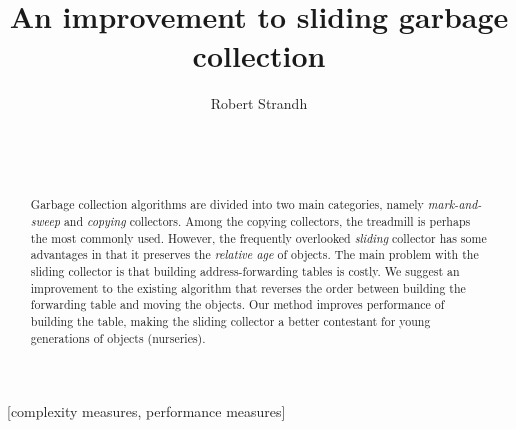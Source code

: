 \documentclass{acm_proc_article-sp}
\def\inputtex#1{}
\begin{document}
\title{An improvement to sliding garbage collection}
\author{\alignauthor
Robert Strandh\\
\\
\\
\\
}

\maketitle

\begin{abstract}
Garbage collection algorithms are divided into two main categories,
namely \emph{mark-and-sweep} and \emph{copying} collectors.  Among the
copying collectors, the treadmill is perhaps the most
commonly used.  However, the frequently overlooked \emph{sliding}
collector has some advantages in that it preserves the \emph{relative
  age} of objects.  The main problem with the sliding collector is
that building address-forwarding tables is costly.  We suggest an
improvement to the existing algorithm that reverses the order between
building the forwarding table and moving the objects.  Our method
improves performance of building the table, making the sliding
collector a better contestant for young generations of objects
(nurseries). 
\end{abstract}

[complexity measures, performance measures]

\inputtex{sec-introduction.tex}
\inputtex{sec-previous.tex}
\inputtex{sec-our-method.tex}
\inputtex{sec-performance.tex}
\inputtex{sec-conclusions.tex}



\end{document}
